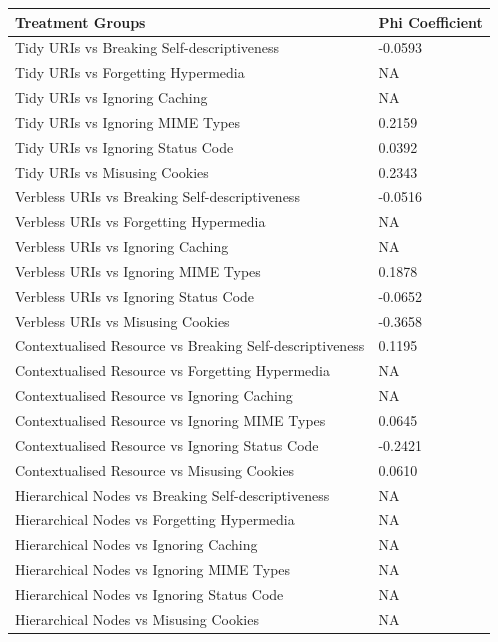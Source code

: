 \documentclass[a4paper,12pt]{article}
\begin{document}
\begin{table}[htb!]
    \centering
   \begin{tabular}{|p{90mm}|p{50mm}|}
\hline \textbf{Treatment Groups} & \textbf{Phi Coefficient} 
\\ \hline 
Tidy URIs vs Breaking Self-descriptiveness & -0.0593
\\ \hline 
Tidy URIs vs Forgetting Hypermedia & NA
\\ \hline 
Tidy URIs vs Ignoring Caching & NA
\\ \hline 
Tidy URIs vs Ignoring MIME Types & 0.2159
\\ \hline 
Tidy URIs vs Ignoring Status Code & 0.0392
\\ \hline 
Tidy URIs vs Misusing Cookies & 0.2343
\\ \hline 
Verbless URIs vs Breaking Self-descriptiveness & -0.0516
\\ \hline 
Verbless URIs vs Forgetting Hypermedia & NA
\\ \hline 
Verbless URIs vs Ignoring Caching & NA
\\ \hline 
Verbless URIs vs Ignoring MIME Types & 0.1878
\\ \hline 
Verbless URIs vs Ignoring Status Code & -0.0652
\\ \hline 
Verbless URIs vs Misusing Cookies & -0.3658
\\ \hline 
Contextualised Resource vs Breaking Self-descriptiveness & 0.1195
\\ \hline 
Contextualised Resource vs Forgetting Hypermedia & NA
\\ \hline 
Contextualised Resource vs Ignoring Caching & NA
\\ \hline 
Contextualised Resource vs Ignoring MIME Types & 0.0645
\\ \hline 
Contextualised Resource vs Ignoring Status Code & -0.2421
\\ \hline 
Contextualised Resource vs Misusing Cookies & 0.0610
\\ \hline 
Hierarchical Nodes vs Breaking Self-descriptiveness & NA
\\ \hline 
Hierarchical Nodes vs Forgetting Hypermedia & NA
\\ \hline 
Hierarchical Nodes vs Ignoring Caching & NA
\\ \hline 
Hierarchical Nodes vs Ignoring MIME Types & NA
\\ \hline 
Hierarchical Nodes vs Ignoring Status Code & NA
\\ \hline 
Hierarchical Nodes vs Misusing Cookies & NA
\\ \hline 

\end{tabular}
\end{table}
\end{document}
